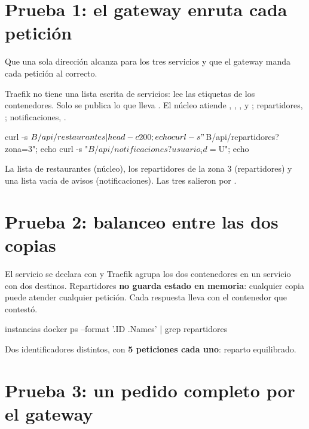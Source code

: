\documentclass[11pt]{article}
\begin{document}
\section{Prueba 1: el gateway enruta cada petición}

\queria Que una sola dirección alcanza para los tres servicios y que el gateway manda cada petición al
correcto.

\comofunciona Traefik no tiene una lista escrita de servicios: lee las etiquetas de los contenedores.
Solo se publica lo que lleva . El núcleo atiende ,
, ,  y ; repartidores,
; notificaciones, .

\begin{comando}
curl -s $B/api/restaurantes | head -c 200; echo
curl -s "$B/api/repartidores?zona=3"; echo
curl -s "$B/api/notificaciones?usuario_id=$U"; echo
\end{comando}

\observado La lista de restaurantes (núcleo), los repartidores de la zona 3 (repartidores) y una lista
vacía de avisos (notificaciones). Las tres salieron por .

\section{Prueba 2: balanceo entre las dos copias}

\comofunciona El servicio se declara con  y Traefik agrupa los dos contenedores
en un servicio con dos destinos. Repartidores \textbf{no guarda estado en memoria}: cualquier copia
puede atender cualquier petición. Cada respuesta lleva  con el contenedor que contestó.

\begin{comando}
instancias
docker ps --format '{{.ID}} {{.Names}}' | grep repartidores
\end{comando}

\observado Dos identificadores distintos, con \textbf{5 peticiones cada uno}: reparto equilibrado.

\section{Prueba 3: un pedido completo por el gateway}
\end{document}
